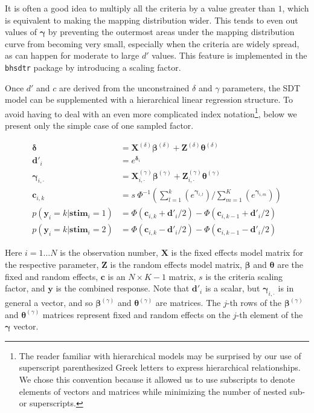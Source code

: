 \documentclass[a4paper,man,apacite,floatsintext]{apa6}
\newcommand{\code}[1]{\texttt{#1}}
\begin{document}
It is often a good idea to multiply all the criteria by a value
greater than $1$, which is equivalent to making the mapping
distribution wider. This tends to even out values of $\bm{\gamma}$ by
preventing the outermost areas under the mapping distribution curve
from becoming very small, especially when the criteria are widely
spread, as can happen for moderate to large $d'$ values. This feature
is implemented in the \code{bhsdtr} package by introducing a scaling
factor.

Once $d'$ and $c$ are derived from the unconstrained $\delta$ and
$\gamma$ parameters, the SDT model can be supplemented with a
hierarchical linear regression structure. To avoid having to deal with
an even more complicated index notation\footnote{The reader familiar
  with hierarchical models may be surprised by our use of superscript
  parenthesized Greek letters to express hierarchical
  relationships. We chose this convention because it allowed us to use
  subscripts to denote elements of vectors and matrices while
  minimizing the number of nested sub- or superscripts.}, below we
present only the simple case of one sampled factor.

\begin{align*}
  \bm{\delta} &= \bm{X}^{(\delta)} \bm{\beta}^{(\delta)} + \bm{Z}^{(\delta)} \bm{\theta}^{(\delta)} \\
  \bm{d'}_i &= e^{\bm{\delta}_i} \\
  \bm{\gamma}_{i,\cdot} &= \bm{X}^{(\gamma)}_{i,\cdot} \bm{\beta}^{(\gamma)} + \bm{Z}^{(\gamma)}_{i,\cdot}
                      \bm{\theta}^{(\gamma)} \\
  \bm{c}_{i,k} &= s \ \Phi^{-1}(\sum_{l = 1}^k(e^{\bm{\gamma}_{i,l}}) /
                 \sum_{m=1}^K(e^{\bm{\gamma}_{i,m}})) \\
  p(\bm{y}_i = k|\bm{stim}_i = 1) &= \Phi(\bm{c}_{i,k} + \bm{d'}_i / 2) - \Phi(\bm{c}_{i,k-1} + \bm{d'}_i / 2) \\
  p(\bm{y}_i = k|\bm{stim}_i = 2) &= \Phi(\bm{c}_{i,k} - \bm{d'}_i / 2) - \Phi(\bm{c}_{i,k-1} - \bm{d'}_i / 2)
\end{align*}

\noindent Here $i = 1\dots N$ is the observation number, $\bm{X}$ is
the fixed effects model matrix for the respective parameter, $\bm{Z}$
is the random effects model matrix, $\bm{\beta}$ and $\bm{\theta}$ are
the fixed and random effects, $\bm{c}$ is an $N \times K-1$ matrix,
$s$ is the criteria scaling factor, and $\bm{y}$ is the combined
response. Note that $\bm{d'}_i$ is a scalar, but
$\bm{\gamma}_{i,\cdot}$ is in general a vector, and so
$\bm{\beta}^{(\gamma)}$ and $\bm{\theta}^{(\gamma)}$ are matrices. The
$j$-th rows of the $\bm{\beta}^{(\gamma)}$ and
$\bm{\theta}^{(\gamma)}$ matrices represent fixed and random effects
on the $j$-th element of the $\bm{\gamma}$ vector.
\end{document}

